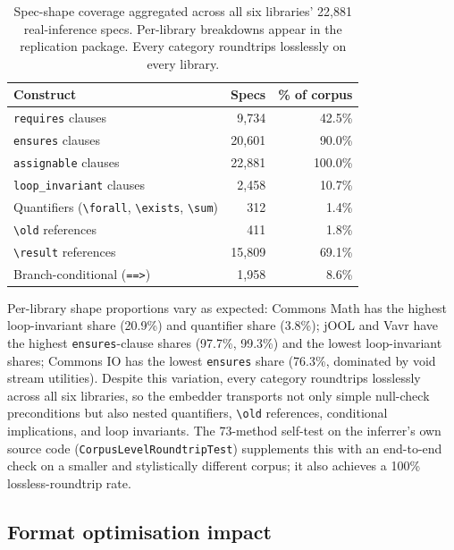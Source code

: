 \begin{table}[ht]
\centering
\caption{Spec-shape coverage aggregated across all six libraries' 22{,}881 real-inference specs. Per-library breakdowns appear in the replication package. Every category roundtrips losslessly on every library.}
\label{tab:shapes}
\begin{tabular}{lrr}
\toprule
\textbf{Construct} & \textbf{Specs} & \textbf{\% of corpus} \\
\midrule
\texttt{requires} clauses               & 9{,}734  & 42.5\% \\
\texttt{ensures} clauses                & 20{,}601 & 90.0\% \\
\texttt{assignable} clauses             & 22{,}881 & 100.0\% \\
\texttt{loop\_invariant} clauses        & 2{,}458  & 10.7\% \\
Quantifiers (\texttt{\textbackslash forall}, \texttt{\textbackslash exists}, \texttt{\textbackslash sum}) & 312 & 1.4\% \\
\texttt{\textbackslash old} references  & 411    & 1.8\% \\
\texttt{\textbackslash result} references & 15{,}809 & 69.1\% \\
Branch-conditional (\texttt{==>})       & 1{,}958  & 8.6\% \\
\bottomrule
\end{tabular}
\end{table}

Per-library shape proportions vary as expected: Commons Math has the highest loop-invariant share (20.9\%) and quantifier share (3.8\%); jOOL and Vavr have the highest \texttt{ensures}-clause shares (97.7\%, 99.3\%) and the lowest loop-invariant shares; Commons IO has the lowest \texttt{ensures} share (76.3\%, dominated by void stream utilities). Despite this variation, every category roundtrips losslessly across all six libraries, so the embedder transports not only simple null-check preconditions but also nested quantifiers, \texttt{\textbackslash old} references, conditional implications, and loop invariants. The 73-method self-test on the inferrer's own source code (\texttt{CorpusLevelRoundtripTest}) supplements this with an end-to-end check on a smaller and stylistically different corpus; it also achieves a 100\% lossless-roundtrip rate.

\subsection{Format optimisation impact}
\label{subsec:format-opt}

